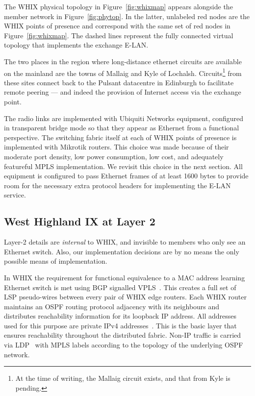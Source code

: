 The \ac{WHIX} physical topology in Figure~\ref{fig:whixmap} appears alongside
the member network in Figure~\ref{fig:phytop}. In the latter,
unlabeled red nodes are the \ac{WHIX} points of presence and
correspond with the same set of red nodes in Figure~\ref{fig:whixmap}.
The dashed lines represent the fully connected virtual topology that
implements the exchange E-LAN.

The two places in the region where long-distance ethernet circuits are
available on the mainland are the towns of Mallaig and Kyle of
Lochalsh. Circuits\footnote{\small{At the time of writing, the Mallaig
circuit exists, and that from Kyle is pending.}} from these sites
connect back to the Pulsant datacentre in Edinburgh to facilitate
remote peering --- and indeed the provision of Internet access via the
exchange point.

The radio links are implemented with Ubiquiti Networks equipment,
configured in transparent bridge mode so that they appear as Ethernet from a
functional perspective. The switching fabric itself at each of \ac{WHIX} points
of presence is implemented with Mikrotik routers. This choice was made because
of their moderate port density, low power consumption, low cost, and adequately
featureful \acs{MPLS} implementation. We revisit this choice in the next
section. All equipment is configured to pass Ethernet frames of at least 1600
bytes to provide room for the necessary extra protocol headers for implementing
the E-LAN service.

\subsection{West Highland IX at Layer 2}\label{sec:bgpvpls}

Layer-2 details are \emph{internal} to
\ac{WHIX}, and invisible to members who only see an Ethernet switch. Also, our
implementation decisions are by no means the only possible means of
implementation.

In \ac{WHIX} the requirement for functional equivalence to a \acs{MAC} address
learning Ethernet switch is met using \acs{BGP} signalled
\acs{VPLS}~\cite{rfc4761}. This creates a full set of \acs{LSP} pseudo-wires
between every pair of \ac{WHIX} edge routers.
Each \ac{WHIX} router maintains an \acs{OSPF} routing protocol
adjacency with its neighbours and distributes reachability information
for its loopback IP address. All addresses used for this purpose are
private IPv4 addresses~\cite{rfc1918}. This is the basic layer that
ensures reachability throughout the distributed fabric.
Non-IP traffic is carried via \acs{LDP}~\cite{rfc5036}
with \acs{MPLS} labels according to the topology of the underlying \acs{OSPF}
network.

